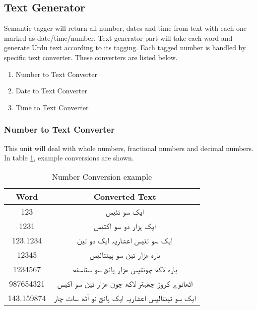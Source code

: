 \subsection{Text Generator}
Semantic tagger will return all number, dates and time from text with each one marked as date/time/number. Text generator part will take each word and generate Urdu text according to its tagging. Each tagged number is handled by specific text converter. These converters are listed below.

\begin{enumerate}
  \item Number to Text Converter
  \item Date to Text Converter 
  \item Time to Text Converter
\end{enumerate}

\subsubsection{Number to Text Converter}
This unit will deal with whole numbers, fractional numbers and decimal numbers. In table \ref{table:no_conversion_example}, example conversions are shown. 

\begin{table}[]
\centering
\begin{tabular}{|c|c|}
\hline
\textbf{Word} & \textbf{Converted Text}                          \\ \hline
123           & \texturdu{ایک سو تئیس}                                     \\ \hline
1231          & \texturdu{ایک ہزار دو سو اکتیس}                            \\ \hline
123.1234      & \texturdu{ایک سو تئیس اعشاریہ ایک دو تین}                   \\ \hline
12345         & \texturdu{بارہ ھزار تین سو پینتالیس}                        \\ \hline
1234567       & \texturdu{بارہ لاکھ چونتیس ھزار پانچ سو ستاسٹھ}             \\ \hline
987654321     & \texturdu{اٹھانوے کروڑ  چھہتر لاکھ   چون ھزار تین سو اکیس}  \\ \hline
143.159874    & \texturdu{ایک سو تینتالیس  اعشاریہ ایک پانچ نو آٹھ سات چار} \\ \hline
\end{tabular}
\caption{Number Conversion example}
\label{table:no_conversion_example}
\end{table}

